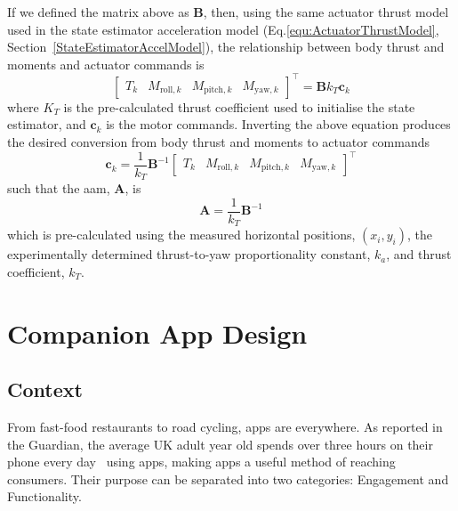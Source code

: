 \documentclass{report_template_oxford}
\begin{document}
If we defined the matrix above as $\mathbf{B}$, then, using the same actuator thrust model used in the state estimator acceleration model (Eq.\ref{equ:ActuatorThrustModel}, Section~\ref{StateEstimatorAccelModel}), the relationship between body thrust and moments and actuator commands is
\begin{equation}
        \begin{bmatrix}
    T_k &
    M_{\mathrm{roll},k} &
    M_{\mathrm{pitch},k} &
    M_{\mathrm{yaw},k}
    \end{bmatrix} ^\top = \mathbf{B} k_{T} \mathbf{c}_k
\end{equation}
where $K_{T}$ is the pre-calculated thrust coefficient used to initialise the state estimator, and $\mathbf{c}_k$ is the motor commands.
Inverting the above equation produces the desired conversion from body thrust and moments to actuator commands
\begin{equation}
    \mathbf{c}_k = \frac{1}{k_{T}}
    \mathbf{B}^{-1} 
    \begin{bmatrix}
    T_k &
    M_{\mathrm{roll},k} &
    M_{\mathrm{pitch},k} &
    M_{\mathrm{yaw},k}
    \end{bmatrix} ^\top   
\end{equation}
such that the \gls{aam}, $\mathbf{A}$, is
\begin{equation}
    \mathbf{A} = \frac{1}{k_{T}} \mathbf{B}^{-1}
\end{equation}
which is pre-calculated using the measured horizontal positions, $(x_i,y_i)$, the experimentally determined thrust-to-yaw proportionality constant, $k_a$, and thrust coefficient, $k_T$.

\newpage


\section{Companion App Design} %
\label{app}
\subsection{Context}
From fast-food restaurants to road cycling, apps are everywhere. As reported in the Guardian, the average UK adult year old spends over three hours on their phone every day~\cite{theguardianAdultsGreat} using apps, making apps a useful method of reaching consumers. Their purpose can be separated into two categories: Engagement and Functionality. %
\end{document}
